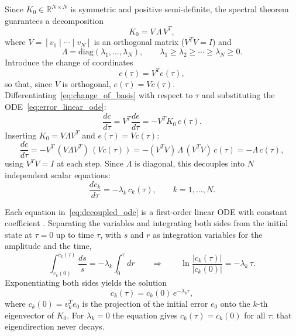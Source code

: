 Since $K_0 \in \mathbb{R}^{N \times N}$ is symmetric and positive semi-definite, the spectral theorem guarantees a decomposition
\begin{equation}\label{eq:spectral_decomp}
    K_0 = V\,\Lambda\,V^T,
\end{equation}
where $V = [v_1 \mid \cdots \mid v_{N}]$ is an orthogonal matrix ($V^T V = I$) and
\begin{equation}
    \Lambda = \mathrm{diag}(\lambda_1,\ldots,\lambda_{N}), \qquad \lambda_1 \geq \lambda_2 \geq \cdots \geq \lambda_{N} \geq 0.
\end{equation}
Introduce the change of coordinates
\begin{equation}\label{eq:change_of_basis}
    c(\tau) = V^T e(\tau),
\end{equation}
so that, since $V$ is orthogonal, $e(\tau) = V c(\tau)$. Differentiating~\eqref{eq:change_of_basis} with respect to $\tau$ and substituting the ODE~\eqref{eq:error_linear_ode}:
\begin{equation}
    \frac{dc}{d\tau} = V^T \frac{de}{d\tau} = -V^T K_0\,e(\tau).
\end{equation}
Inserting $K_0 = V\Lambda V^T$ and $e(\tau) = Vc(\tau)$:
\begin{equation}
    \frac{dc}{d\tau}
    = -V^T\,(V\Lambda V^T)\,(Vc(\tau))
    = -(V^T V)\,\Lambda\,(V^T V)\,c(\tau)
    = -\Lambda\,c(\tau),
\end{equation}
using $V^T V = I$ at each step. Since $\Lambda$ is diagonal, this decouples into $N$ independent scalar equations:
\begin{equation}\label{eq:decoupled_ode}
    \frac{dc_k}{d\tau} = -\lambda_k\,c_k(\tau), \qquad k = 1,\ldots,N.
\end{equation}

Each equation in~\eqref{eq:decoupled_ode} is a first-order linear ODE with constant coefficient \parencite{strogatz2018}. Separating the variables and integrating both sides from the initial state at $\tau = 0$ up to time $\tau$, with $s$ and $r$ as integration variables for the amplitude and the time,
\begin{equation}
    \int_{c_k(0)}^{c_k(\tau)} \frac{ds}{s}
    = -\lambda_k \int_0^{\tau} dr
    \qquad\Longrightarrow\qquad
    \ln\frac{|c_k(\tau)|}{|c_k(0)|} = -\lambda_k\,\tau.
\end{equation}
Exponentiating both sides yields the solution
\begin{equation}\label{eq:error_mode}
    c_k(\tau) = c_k(0)\,e^{-\lambda_k\tau},
\end{equation}
where $c_k(0) = v_k^T e_0$ is the projection of the initial error $e_0$ onto the $k$-th eigenvector of $K_0$. For $\lambda_k = 0$ the equation gives $c_k(\tau) = c_k(0)$ for all $\tau$: that eigendirection never decays.

